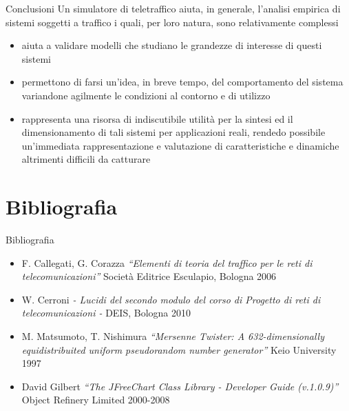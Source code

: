 \documentclass[slidestop,compress,mathserif]{beamer}
\begin{document}
\begin{frame}{Conclusioni}
\vfill
Un simulatore di teletraffico aiuta, in generale, l'analisi empirica di sistemi soggetti a traffico i quali, per loro natura, sono relativamente complessi
		\begin{itemize}
		\footnotesize
			\item aiuta a validare modelli che studiano le grandezze di interesse di questi sistemi
			\item permettono di farsi un'idea, in breve tempo, del comportamento del sistema variandone agilmente le condizioni al contorno e di utilizzo
			\item rappresenta una risorsa di indiscutibile utilit\`a per la sintesi ed il dimensionamento di tali sistemi per applicazioni reali, rendedo possibile un'immediata rappresentazione e valutazione di caratteristiche e dinamiche altrimenti difficili da catturare
		\end{itemize}
\vfill
\end{frame}



\section*{}

\section{Bibliografia}
\begin{frame}{Bibliografia}
\begin{itemize}
\item  F. Callegati, G. Corazza
  \emph{``Elementi di teoria del traffico per le reti di telecomunicazioni''}
  Societ\`a Editrice Esculapio, Bologna
  2006

\item
  W. Cerroni
  \emph{- Lucidi del secondo modulo del corso di Progetto di reti di telecomunicazioni -}
  DEIS, Bologna
  2010

\item
  M. Matsumoto, T. Nishimura
  \emph{``Mersenne Twister: A 632-dimensionally equidistribuited uniform pseudorandom number generator''}
  Keio University
  1997

\item
  David Gilbert \emph{``The JFreeChart Class Library - Developer Guide (v.1.0.9)''}
  Object Refinery Limited
  2000-2008
\end{itemize}
\end{frame}


\frame{\titlepage}
\end{document}
